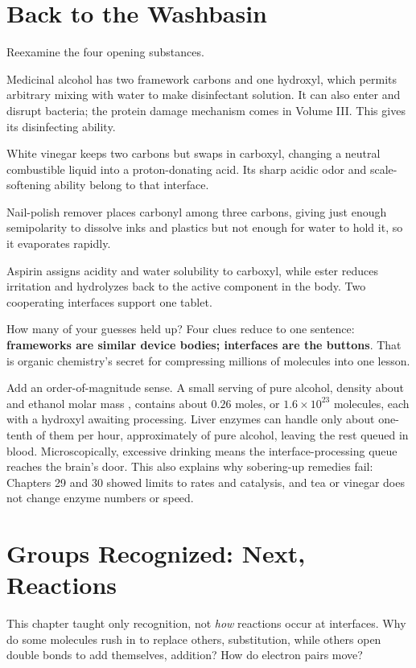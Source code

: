 \section{Back to the Washbasin}

Reexamine the four opening substances.

Medicinal alcohol has two framework carbons and one hydroxyl, which permits arbitrary mixing with water to make disinfectant solution. It can also enter and disrupt bacteria; the protein damage mechanism comes in Volume III. This gives its disinfecting ability.

White vinegar keeps two carbons but swaps in carboxyl, changing a neutral combustible liquid into a proton-donating acid. Its sharp acidic odor and scale-softening ability belong to that interface.

Nail-polish remover places carbonyl among three carbons, giving just enough semipolarity to dissolve inks and plastics but not enough for water to hold it, so it evaporates rapidly.

Aspirin assigns acidity and water solubility to carboxyl, while ester reduces irritation and hydrolyzes back to the active component in the body. Two cooperating interfaces support one tablet.

How many of your guesses held up? Four clues reduce to one sentence: \textbf{frameworks are similar device bodies; interfaces are the buttons}. That is organic chemistry's secret for compressing millions of molecules into one lesson.

Add an order-of-magnitude sense. A small  serving of pure alcohol, density about  and ethanol molar mass , contains about $0.26$ moles, or $1.6\times 10^{23}$ molecules, each with a hydroxyl awaiting processing. Liver enzymes can handle only about one-tenth of them per hour, approximately  of pure alcohol, leaving the rest queued in blood. Microscopically, excessive drinking means the interface-processing queue reaches the brain's door. This also explains why sobering-up remedies fail: Chapters 29 and 30 showed limits to rates and catalysis, and tea or vinegar does not change enzyme numbers or speed.

\section{Groups Recognized: Next, Reactions}

This chapter taught only recognition, not \emph{how} reactions occur at interfaces. Why do some molecules rush in to replace others, substitution, while others open double bonds to add themselves, addition? How do electron pairs move?

